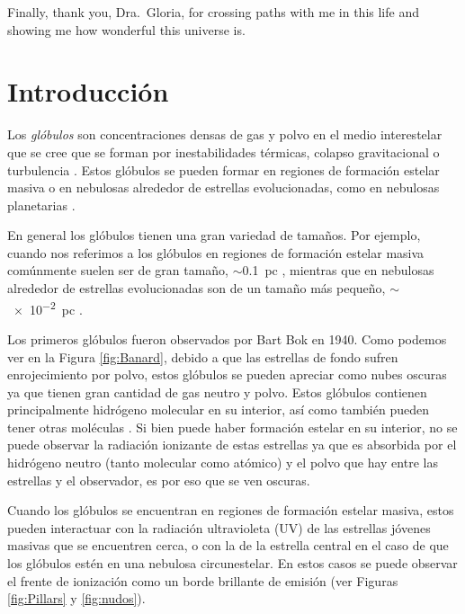 \documentclass{book}
\begin{document}
Finally, thank you, Dra.~Gloria, for crossing paths with me in this life and showing me how wonderful this universe is.  

\newpage

\tableofcontents

\newpage

\chapter{Introducción}\label{Capitulo 1:introduccion}

Los \textit{glóbulos} son concentraciones densas de gas y polvo en el medio interestelar que se cree que se forman por inestabilidades térmicas, colapso gravitacional o turbulencia \citep{Ballesteros:2011,Padoan:2002}. Estos glóbulos se pueden formar en regiones de formación estelar masiva o en nebulosas alrededor de estrellas evolucionadas, como en nebulosas planetarias \citep{O'Dell:2007}.

En general los glóbulos tienen una gran variedad de tamaños. Por ejemplo, cuando nos referimos a los glóbulos en regiones de formación estelar masiva comúnmente suelen ser de gran tamaño, $\sim$\SI{0.1}{pc} \citep{Schenider:2016}, mientras que en nebulosas alrededor de estrellas evolucionadas son de un tamaño más pequeño, $\sim$\SI{e-2}{pc} \citep{GFGahm:2013}.

Los primeros glóbulos fueron observados por Bart Bok en 1940. Como podemos ver en la Figura \ref{fig:Banard}, debido a que las estrellas de fondo sufren enrojecimiento por polvo, estos glóbulos se pueden apreciar como nubes oscuras ya que tienen gran cantidad de gas neutro y polvo. Estos glóbulos contienen principalmente hidrógeno molecular en su interior, así como también pueden tener otras moléculas \citep{Amin:2005, DFrancesco:2002}. Si bien puede haber formación estelar en su interior, no se puede observar la radiación ionizante de estas estrellas ya que es absorbida por el hidrógeno neutro (tanto molecular como atómico) y el polvo que hay entre las estrellas y el observador, es por eso que se ven oscuras.

Cuando los glóbulos se encuentran en regiones de formación estelar masiva, estos pueden interactuar con la radiación ultravioleta (UV) de las estrellas jóvenes masivas que se encuentren cerca, o con la de la estrella central en el caso de que los glóbulos estén en una nebulosa circunestelar. En estos casos se puede observar el frente de ionización como un borde brillante de emisión (ver Figuras \ref{fig:Pillars} y \ref{fig:nudos}).
\end{document}
